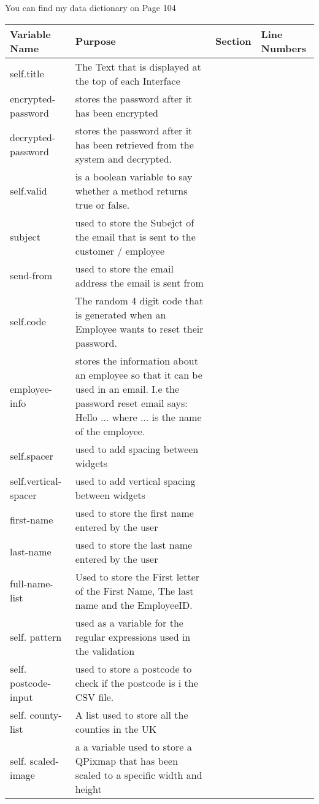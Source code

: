 You can find my data dictionary on Page 104 

    \begin{longtable}{|p{1.5cm}|p{4.5cm}|p{2cm}|p{2cm}|}
        \hline
        \textbf{Variable Name} & \textbf{Purpose} & \textbf{Section} & \textbf{Line Numbers}\\ \hline
	self.title & The Text that is displayed at the top of each Interface & & \\ \hline
	encrypted-password & stores the password after it has been encrypted & & \\ \hline
	decrypted-password & stores the password after it has been retrieved from the system and decrypted. & & \\ \hline
	self.valid & is a boolean variable to say whether a method returns true or false. & & \\ \hline
	subject & used to store the Subejct of the email that is sent to the customer / employee & & \\ \hline
	send-from & used to store the email address the email is sent from & & \\ \hline
	self.code & The random 4 digit code that is generated when an Employee wants to reset their password. & & \\ \hline
	employee-info & stores the information about an employee so that it can be used in an email. I.e the password reset email says: Hello ... where ... is the name of the employee. & & \\ \hline
	self.spacer & used to add spacing between widgets & & \\ \hline
	self.vertical-spacer& used to add vertical spacing between widgets & & \\ \hline
	first-name & used to store the first name entered by the user & & \\ \hline
	last-name & used to store the last name entered by the user & & \\ \hline
	full-name-list & Used to store the First letter of the First Name, The last name and the EmployeeID. & & \\ \hline
	self. pattern & used as a variable for the regular expressions used in the validation & & \\ \hline
	self. postcode-input & used to store a postcode to check if the postcode is i the CSV file. & & \\ \hline
	self. county-list & A list used to  store all the counties in the UK & & \\ \hline
	self. scaled-image & a a variable used to store a QPixmap that has been scaled to a specific width and height & & \\ \hline

\end{longtable}
